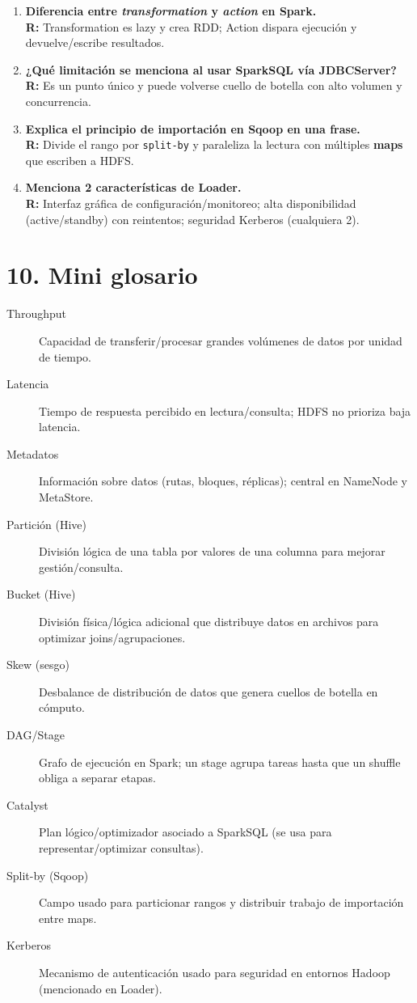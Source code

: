 \documentclass[8pt,a4paper,twocolumn]{article}
\begin{document}
\begin{enumerate}
\item \textbf{Diferencia entre \textit{transformation} y \textit{action} en Spark.}\\
\textbf{R:} Transformation es lazy y crea RDD; Action dispara ejecución y devuelve/escribe resultados.

\item \textbf{¿Qué limitación se menciona al usar SparkSQL vía JDBCServer?}\\
\textbf{R:} Es un punto único y puede volverse cuello de botella con alto volumen y concurrencia.

\item \textbf{Explica el principio de importación en Sqoop en una frase.}\\
\textbf{R:} Divide el rango por \texttt{split-by} y paraleliza la lectura con múltiples \textbf{maps} que escriben a HDFS.

\item \textbf{Menciona 2 características de Loader.}\\
\textbf{R:} Interfaz gráfica de configuración/monitoreo; alta disponibilidad (active/standby) con reintentos; seguridad Kerberos (cualquiera 2).
\end{enumerate}

\section{10. Mini glosario}
\begin{description}
\item[Throughput] Capacidad de transferir/procesar grandes volúmenes de datos por unidad de tiempo.
\item[Latencia] Tiempo de respuesta percibido en lectura/consulta; HDFS no prioriza baja latencia.
\item[Metadatos] Información sobre datos (rutas, bloques, réplicas); central en NameNode y MetaStore.
\item[Partición (Hive)] División lógica de una tabla por valores de una columna para mejorar gestión/consulta.
\item[Bucket (Hive)] División física/lógica adicional que distribuye datos en archivos para optimizar joins/agrupaciones.
\item[Skew (sesgo)] Desbalance de distribución de datos que genera cuellos de botella en cómputo.
\item[DAG/Stage] Grafo de ejecución en Spark; un stage agrupa tareas hasta que un shuffle obliga a separar etapas.
\item[Catalyst] Plan lógico/optimizador asociado a SparkSQL (se usa para representar/optimizar consultas).
\item[Split-by (Sqoop)] Campo usado para particionar rangos y distribuir trabajo de importación entre maps.
\item[Kerberos] Mecanismo de autenticación usado para seguridad en entornos Hadoop (mencionado en Loader).
\end{description}
\end{document}
